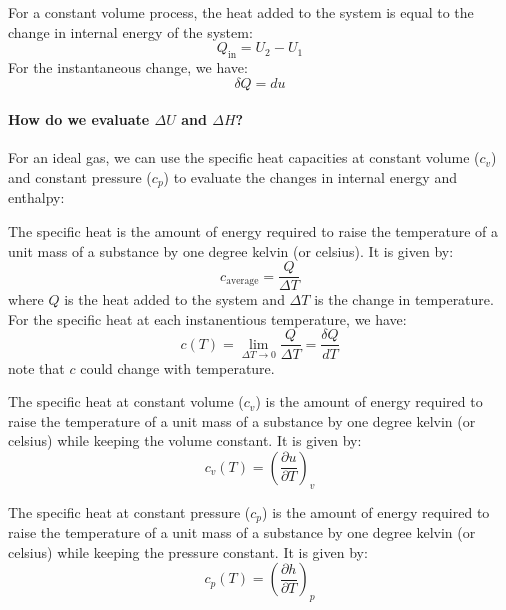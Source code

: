 \documentclass[11pt]{report}
\begin{document}
\begin{theorem}
    For a constant volume process, the heat added to the system is equal to the change in internal energy of the system:
    \begin{equation}
        Q_{\text{in}} = U_2 - U_1
    \end{equation}
    For the instantaneous change, we have:
    $$
        \delta Q = du
    $$  
\end{theorem}

\paragraph{How do we evaluate $\Delta U$ and $\Delta H$?} For an ideal gas, we can use the specific heat capacities at constant volume ($c_v$) and constant pressure ($c_p$) to evaluate the changes in internal energy and enthalpy:
\begin{definition}
    The specific heat is the amount of energy required to raise the temperature of a unit mass of a substance by one degree kelvin (or celsius). It is given by:
    \begin{equation}
        c_{\text{average}} = \frac{Q}{\Delta T}
    \end{equation}
    where $Q$ is the heat added to the system and $\Delta T$ is the change in temperature. For the specific heat at each instanentious temperature, we have:
    \begin{equation}
        c(T) = \lim_{\Delta T \to 0} \frac{Q}{\Delta T} = \frac{\delta Q}{dT}
    \end{equation}
    note that $c$ could change with temperature.
\end{definition}

\begin{definition}
    The specific heat at constant volume ($c_v$) is the amount of energy required to raise the temperature of a unit mass of a substance by one degree kelvin (or celsius) while keeping the volume constant. It is given by:
    \begin{equation}
        c_v(T) = \left(\frac{\partial u}{\partial T}\right)_v 
    \end{equation}
\end{definition}

\begin{definition}
    The specific heat at constant pressure ($c_p$) is the amount of energy required to raise the temperature of a unit mass of a substance by one degree kelvin (or celsius) while keeping the pressure constant. It is given by:
    \begin{equation}
        c_p(T) = \left(\frac{\partial h}{\partial T}\right)_p 
    \end{equation}
\end{definition}
\end{document}
